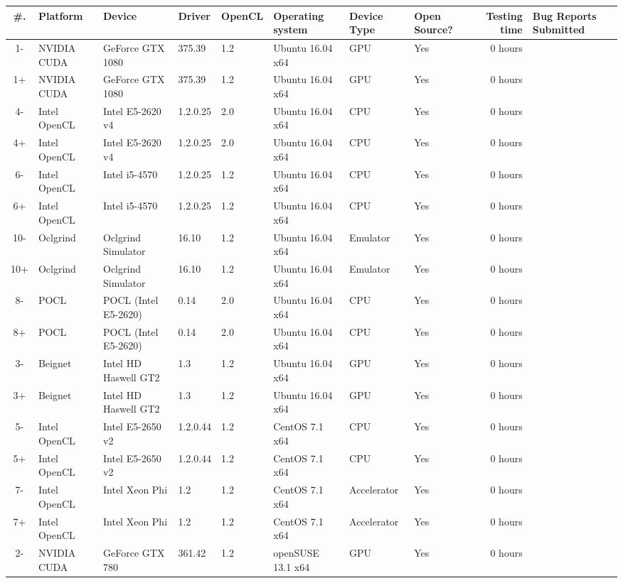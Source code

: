 \begin{tabular}{ cllllllL{1cm} | rR{1.4cm} }
\toprule
\textbf{\#. } & \textbf{Platform} & \textbf{Device} & \textbf{Driver} & \textbf{OpenCL} & 
\textbf{Operating system} & \textbf{Device Type} & \textbf{Open Source?} & \textbf{Testing time} & \textbf{Bug Reports Submitted} \\
- & NVIDIA CUDA & GeForce GTX 1080 & 375.39 & 1.2 & Ubuntu 16.04 x64 & GPU & Yes & 0 hours \\
1+ & NVIDIA CUDA & GeForce GTX 1080 & 375.39 & 1.2 & Ubuntu 16.04 x64 & GPU & Yes & 0 hours \\
4- & Intel OpenCL & Intel E5-2620 v4 & 1.2.0.25 & 2.0 & Ubuntu 16.04 x64 & CPU & Yes & 0 hours \\
4+ & Intel OpenCL & Intel E5-2620 v4 & 1.2.0.25 & 2.0 & Ubuntu 16.04 x64 & CPU & Yes & 0 hours \\
6- & Intel OpenCL & Intel i5-4570 & 1.2.0.25 & 1.2 & Ubuntu 16.04 x64 & CPU & Yes & 0 hours \\
6+ & Intel OpenCL & Intel i5-4570 & 1.2.0.25 & 1.2 & Ubuntu 16.04 x64 & CPU & Yes & 0 hours \\
10- & Oclgrind & Oclgrind Simulator & 16.10 & 1.2 & Ubuntu 16.04 x64 & Emulator & Yes & 0 hours \\
10+ & Oclgrind & Oclgrind Simulator & 16.10 & 1.2 & Ubuntu 16.04 x64 & Emulator & Yes & 0 hours \\
8- & POCL & POCL (Intel E5-2620) & 0.14 & 2.0 & Ubuntu 16.04 x64 & CPU & Yes & 0 hours \\
8+ & POCL & POCL (Intel E5-2620) & 0.14 & 2.0 & Ubuntu 16.04 x64 & CPU & Yes & 0 hours \\
3- & Beignet & Intel HD Haswell GT2 & 1.3 & 1.2 & Ubuntu 16.04 x64 & GPU & Yes & 0 hours \\
3+ & Beignet & Intel HD Haswell GT2 & 1.3 & 1.2 & Ubuntu 16.04 x64 & GPU & Yes & 0 hours \\
5- & Intel OpenCL & Intel E5-2650 v2 & 1.2.0.44 & 1.2 & CentOS 7.1 x64 & CPU & Yes & 0 hours \\
5+ & Intel OpenCL & Intel E5-2650 v2 & 1.2.0.44 & 1.2 & CentOS 7.1 x64 & CPU & Yes & 0 hours \\
7- & Intel OpenCL & Intel Xeon Phi & 1.2 & 1.2 & CentOS 7.1 x64 & Accelerator & Yes & 0 hours \\
7+ & Intel OpenCL & Intel Xeon Phi & 1.2 & 1.2 & CentOS 7.1 x64 & Accelerator & Yes & 0 hours \\
2- & NVIDIA CUDA & GeForce GTX 780 & 361.42 & 1.2 & openSUSE 13.1 x64 & GPU & Yes & 0 hours \\

\end{tabular}
